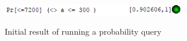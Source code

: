 \begin{figure}[h]
	\centering
	\includegraphics[width=8cm]{graphics/pra300pct.png}
	\label{fig:pra300pct}
	\caption{Initial result of running a probability query}
\end{figure}


